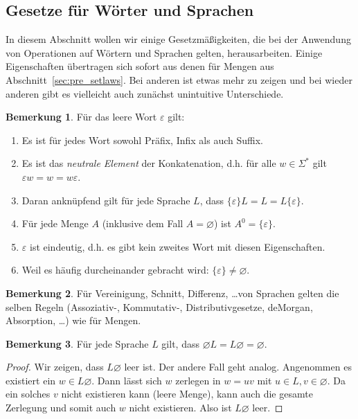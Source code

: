 \documentclass[11pt, a4paper]{article}
\theoremstyle{definition}
\newtheorem*{remark*}{Bemerkung}
\theoremstyle{plain}
\numberwithin{equation}{section}
\let\emptyset\varnothing
\begin{document}
\subsection{Gesetze für Wörter und Sprachen}\label{sec:awl_wordlaws}
In diesem Abschnitt wollen wir einige Gesetzmäßigkeiten, die bei der Anwendung von Operationen auf Wörtern und Sprachen gelten, herausarbeiten. Einige Eigenschaften übertragen sich sofort aus denen für Mengen aus Abschnitt~\ref{sec:pre_setlaws}. Bei anderen ist etwas mehr zu zeigen und bei wieder anderen gibt es vielleicht auch zunächst unintuitive Unterschiede.
\begin{remark*}
	Für das leere Wort $\varepsilon$ gilt:
	\begin{enumerate}
		\item Es ist für jedes Wort sowohl Präfix, Infix als auch Suffix.
		\item Es ist das \textit{neutrale Element} der Konkatenation, d.h. für alle $w \in \Sigma^\ast$ gilt $\varepsilon w = w = w \varepsilon$.
		\item Daran anknüpfend gilt für jede Sprache $L$, dass $ \{ \varepsilon \} L = L = L  \{ \varepsilon \}$.
		\item Für jede Menge $A$ (inklusive dem Fall $A = \emptyset$) ist $A^0 = \{ \varepsilon \}$.
		\item $\varepsilon$ ist eindeutig, d.h. es gibt kein zweites Wort mit diesen Eigenschaften.
		\item Weil es häufig durcheinander gebracht wird: $\{ \varepsilon \} \neq \emptyset$.
	\end{enumerate}
\end{remark*}
\begin{remark*}
	Für Vereinigung, Schnitt, Differenz, \ldots von Sprachen gelten die selben Regeln (Assoziativ-, Kommutativ-, Distributivgesetze, deMorgan, Absorption, \ldots) wie für Mengen.
\end{remark*}
\begin{remark*}
	Für jede Sprache $L$ gilt, dass $\emptyset L = L \emptyset = \emptyset$.
	\begin{proof}
		Wir zeigen, dass $L \emptyset$ leer ist. Der andere Fall geht analog. Angenommen es existiert ein $w \in L \emptyset$. Dann lässt sich $w$ zerlegen in $w = uv$ mit $u \in L, v \in \emptyset$. Da ein solches $v$ nicht existieren kann (leere Menge), kann auch die gesamte Zerlegung und somit auch $w$ nicht existieren. Also ist $L \emptyset$ leer.
	\end{proof}
\end{remark*}
\end{document}
